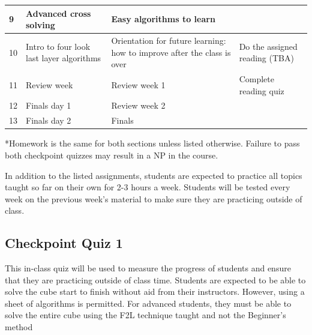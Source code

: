 \documentclass[11pt]{article}
\begin{document}
\begin{center}
\begin{longtable}{|m{1cm}|m{4.6cm}|m{4.6cm}|m{4.6cm}|}
9  & Advanced cross solving                                            & Easy algorithms to learn                                                &                                                                                \\ \hline
10 & Intro to four look last layer algorithms                          & Orientation for future learning: how to improve after the class is over & Do the assigned reading (TBA)                                                  \\ \hline
11 & Review week                                                       & Review week 1                                                           & Complete reading quiz                                                          \\ \hline
12 & Finals day 1                                                      & Review week 2                                                           &                                                                                \\ \hline
13 & Finals day 2                                                      & Finals                                                                  &                                                                                \\ \hline
\end{longtable}
\end{center}

\begin{footnotesize}
*Homework is the same for both sections unless listed otherwise. Failure to pass both checkpoint quizzes may result in a NP in the course.

In addition to the listed assignments, students are expected to practice all topics taught so far on their own for 2-3 hours a week. Students will be tested every week on the previous week’s material to make sure they are practicing outside of class. 
\end{footnotesize}

\subsection*{Checkpoint Quiz 1}
This in-class quiz will be used to measure the progress of students and ensure that they are practicing outside of class time. Students are expected to be able to solve the cube start to finish without aid from their instructors. However, using a sheet of algorithms is permitted. For advanced students, they must be able to solve the entire cube using the F2L technique taught and not the Beginner’s method
\end{document}
